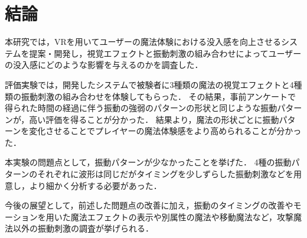 \chapter{結論}
本研究では，VRを用いてユーザーの魔法体験における没入感を向上させるシステムを提案・開発し，視覚エフェクトと振動刺激の組み合わせによってユーザーの没入感にどのような影響を与えるのかを調査した．

評価実験では，開発したシステムで被験者に3種類の魔法の視覚エフェクトと4種類の振動刺激の組み合わせを体験してもらった．
その結果，事前アンケートで得られた時間の経過に伴う振動の強弱のパターンの形状と同じような振動パターンが，高い評価を得ることが分かった．
結果より，魔法の形状ごとに振動パターンを変化させることでプレイヤーの魔法体験感をより高められることが分かった．

本実験の問題点として，振動パターンが少なかったことを挙げた．
4種の振動パターンのそれぞれに波形は同じだがタイミングを少しずらした振動刺激などを用意し，より細かく分析する必要があった．

今後の展望として，前述した問題点の改善に加え，振動のタイミングの改善やモーションを用いた魔法エフェクトの表示や別属性の魔法や移動魔法など，攻撃魔法以外の振動刺激の調査が挙げられる．
  